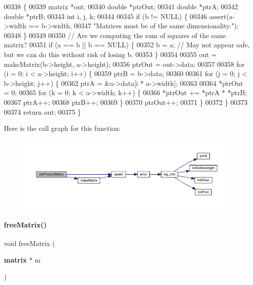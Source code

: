 \begin{DoxyCode}
00338                                                \{
00339   matrix *out;
00340   \textcolor{keywordtype}{double} *ptrOut;
00341   \textcolor{keywordtype}{double} *ptrA;
00342   \textcolor{keywordtype}{double} *ptrB;
00343   \textcolor{keywordtype}{int} i, j, k;
00344 
00345   \textcolor{keywordflow}{if} (b != NULL) \{
00346     assert(a->width == b->width,
00347            \textcolor{stringliteral}{"Matrices must be of the same dimensionality."});
00348   \}
00349 
00350   \textcolor{comment}{// Are we computing the sum of squares of the same matrix?}
00351   \textcolor{keywordflow}{if} (a == b || b == NULL) \{
00352     b = a; \textcolor{comment}{// May not appear safe, but we can do this without risk of losing b.}
00353   \}
00354 
00355   out = makeMatrix(b->height, a->height);
00356   ptrOut = out->data;
00357 
00358   \textcolor{keywordflow}{for} (i = 0; i < a->height; i++) \{
00359     ptrB = b->data;
00360 
00361     \textcolor{keywordflow}{for} (j = 0; j < b->height; j++) \{
00362       ptrA = &a->data[i * a->width];
00363 
00364       *ptrOut = 0;
00365       \textcolor{keywordflow}{for} (k = 0; k < a->width; k++) \{
00366         *ptrOut += *ptrA * *ptrB;
00367         ptrA++;
00368         ptrB++;
00369       \}
00370       ptrOut++;
00371     \}
00372   \}
00373 
00374   \textcolor{keywordflow}{return} out;
00375 \}
\end{DoxyCode}
Here is the call graph for this function\+:
\nopagebreak
\begin{figure}[H]
\begin{center}
\leavevmode
\includegraphics[width=350pt]{matrix_8h_a0b568a64e81a56779c2141b424475976_cgraph}
\end{center}
\end{figure}
\mbox{\label{matrix_8h_ae98365c910e9d688d2bdedec50d89a6b}} 
\paragraph{free\+Matrix()}
{\footnotesize\ttfamily void free\+Matrix (\begin{DoxyParamCaption}\item[{\textbf{ matrix} $\ast$}]{m }\end{DoxyParamCaption})}



